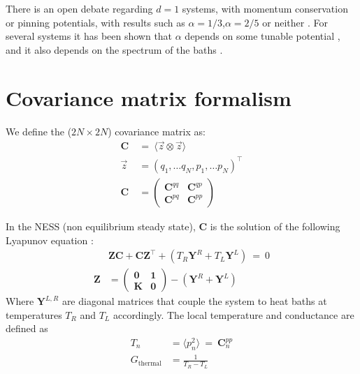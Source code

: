 There is an open debate regarding $d=1$ systems,
with momentum conservation or pinning potentials, 
with results such as $\alpha=1/3$,$\alpha=2/5$ or neither
\cite{narayan_anomalous_2002,delfini_comment_2008,dhar_dhar_2008,wang_power-law_2011,basile_momentum_2006}.
For several systems it has been shown that $\alpha$ depends on some tunable potential \cite{tong_wave_1999},
and it also depends on the spectrum of the baths \cite{dhar_heat_2001}.




\section{Covariance matrix formalism}

We define the ($2N\times 2N$) covariance matrix as:
\begin{align}
\mathbf{C} \ &=\ \langle \vec{z}\otimes \vec{z}\rangle \\
\vec{z} &= (q_1,\ldots q_N, p_1,\ldots p_N)^\intercal\\
\mathbf{C} &= 
              \begin{pmatrix} 
                \mathbf{C}^{qq} & \mathbf{C}^{qp} \\
                \mathbf{C}^{pq} & \mathbf{C}^{pp}
            \end{pmatrix}
\end{align}


In the NESS (non equilibrium steady state), $\mathbf{C}$ 
is the solution of the following Lyapunov equation \cite{bodyfelt_unpub,zheng,zheng_heat_2011,bhatia_how_1997}:
%
\begin{align}
&\mathbf{Z}\mathbf{C} + \mathbf{C}\mathbf{Z}^\intercal + (T_R\mathbf{Y}^R+T_L\mathbf{Y}^L) \ =\  0\\
\mathbf{Z} &= 
              \begin{pmatrix} 
                \mathbf{0} & \mathbf{1} \\
                \mathbf{K} & \mathbf{0} 
              \end{pmatrix} -(\mathbf{Y}^R+\mathbf{Y}^L)
\end{align}
%
Where $\mathbf{Y}^{L,R}$ are diagonal matrices that couple
the system to heat baths at temperatures $T_R$ and $T_L$ accordingly.
%
The local temperature and conductance are defined as
\begin{align}
T_n &= \langle p_n^2 \rangle \ = \ \mathbf{C}^{pp}_{n} \\
G_{\textrm{thermal}} &= \frac{1}{T_R-T_L} 
\end{align}


